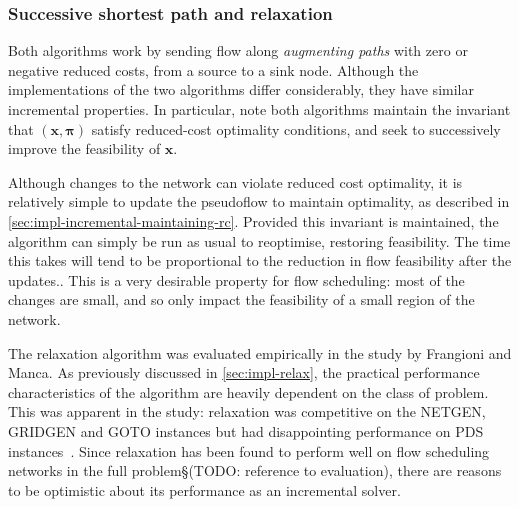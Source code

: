 \subsubsection{Successive shortest path and relaxation}

Both algorithms work by sending flow along \emph{augmenting paths} with zero or negative reduced costs, from a source to a sink node. Although the implementations of the two algorithms differ considerably, they have similar incremental properties. In particular, note both algorithms maintain the invariant that $\left(\mathbf{x},\boldsymbol{\pi}\right)$ satisfy reduced-cost optimality conditions, and seek to successively improve the feasibility of $\mathbf{x}$\footnotemark.

Although changes to the network can violate reduced cost optimality, it is relatively simple to update the pseudoflow to maintain optimality, as described in \cref{sec:impl-incremental-maintaining-rc}. Provided this invariant is maintained, the algorithm can simply be run as usual to reoptimise, restoring feasibility. The time this takes will tend to be proportional to the reduction in flow feasibility after the updates.\footnotemark. This is a very desirable property for flow scheduling: most of the changes are small, and so only impact the feasibility of a small region of the network.

The relaxation algorithm was evaluated empirically in the study by Frangioni and Manca. As previously discussed in \cref{sec:impl-relax}, the practical performance characteristics of the algorithm are heavily dependent on the class of problem. This was apparent in the study: relaxation was competitive on the NETGEN, GRIDGEN and GOTO instances but had disappointing performance on PDS instances~\cite[tables~1~to~4]{Frangioni:2006}. Since relaxation has been found to perform well on flow scheduling networks in the full problem\S(TODO: reference to evaluation), there are reasons to be optimistic about its performance as an incremental solver.

